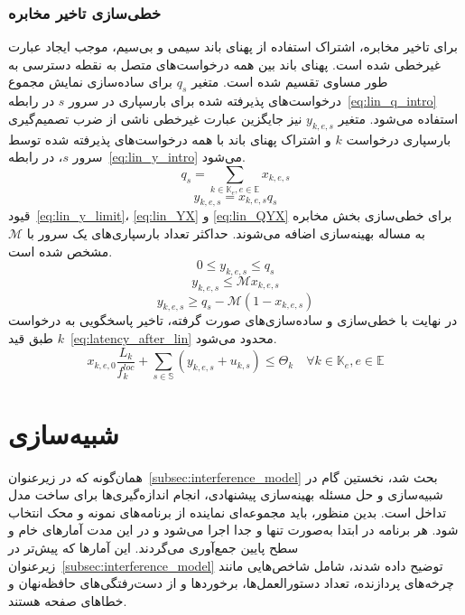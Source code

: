 \subsubsection{خطی‌سازی تاخیر مخابره}
برای تاخیر مخابره، اشتراک استفاده از پهنای باند سیمی و بی‌سیم، موجب ایجاد عبارت غیرخطی شده است. پهنای باند بین همه درخواست‌های متصل به نقطه دسترسی به طور مساوی تقسیم شده است. متغیر $q_s$ برای ساده‌سازی نمایش مجموع درخواست‌های پذیرفته شده برای بارسپاری در سرور $s$ در رابطه~\eqref{eq:lin_q_intro} استفاده می‌شود. متغیر $y_{k,e,s}$ نیز جایگزین عبارت غیرخطی ناشی از ضرب تصمیم‌گیری بارسپاری درخواست $k$ و اشتراک پهنای باند با همه درخواست‌های پذیرفته شده توسط سرور $s$، در رابطه~\eqref{eq:lin_y_intro} می‌شود.
\begin{equation} \label{eq:lin_q_intro}
    q_s = \sum_{k \in \mathbb{K}_e, e \in \mathbb{E}} x_{k,e,s}
\end{equation}
\begin{equation} \label{eq:lin_y_intro}
    y_{k,e,s} = x_{k,e,s} q_s
\end{equation}
قیود~\eqref{eq:lin_y_limit}، \eqref{eq:lin_YX} و \eqref{eq:lin_QYX} برای خطی‌سازی بخش مخابره به مساله بهینه‌سازی اضافه می‌شوند. حداکثر تعداد بارسپاری‌های یک سرور با $\mathcal{M}$ مشخص شده است.
\begin{equation} \label{eq:lin_y_limit}
    0 \leq y_{k,e,s} \leq q_s
\end{equation}
\begin{equation} \label{eq:lin_YX}
    y_{k,e,s} \leq \mathcal{M} x_{k,e,s}
\end{equation}
\begin{equation} \label{eq:lin_QYX}
    y_{k,e,s} \geq q_s - \mathcal{M} (1-x_{k,e,s})
\end{equation}
در نهایت با خطی‌سازی و ساده‌سازی‌های صورت گرفته، تاخیر پاسخگویی به درخواست $k$ طبق قید~\eqref{eq:latency_after_lin} محدود می‌شود.
\begin{equation} \label{eq:latency_after_lin}
    x_{k,e,0}\frac{L_k}{f^{loc}_k} + \sum_{s \in \mathbb{S}} \left(y_{k,e,s} + u_{k,s}\right) \leq \Theta_k \quad \forall k \in \mathbb{K}_e, e \in \mathbb{E}
\end{equation}

\section{شبیه‌سازی}

همان‌گونه که در زیرعنوان~\ref{subsec:interference_model} بحث شد، نخستین گام در شبیه‌سازی و حل مسئله بهینه‌سازی پیشنهادی، انجام اندازه‌گیری‌ها برای ساخت مدل تداخل است. بدین منظور، باید مجموعه‌ای نماینده از برنامه‌های نمونه و محک انتخاب شود. هر برنامه در ابتدا به‌صورت تنها و جدا اجرا می‌شود و در این مدت آمارهای خام و سطح پایین جمع‌آوری می‌گردند. این آمارها که پیش‌تر در زیرعنوان~\ref{subsec:interference_model} توضیح داده شدند، شامل شاخص‌هایی مانند چرخه‌های پردازنده، تعداد دستورالعمل‌ها، برخوردها و از دست‌رفتگی‌های حافظه‌نهان و خطاهای صفحه هستند.

